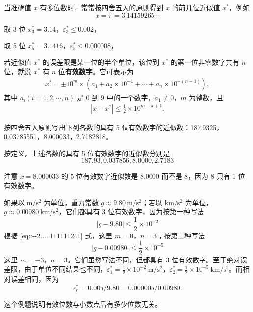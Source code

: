 \documentclass[../../main.tex]{subfiles}%
\begin{document}
\begin{example}
当准确值 $x$ 有多位数时，常常按四舍五入的原则得到 $x$ 的前几位近似值 $x^*$，例如 
\[
x = \pi = 3.14159265\cdots
\]

取 3 位  $x_3^* = 3.14$，$\varepsilon_3^* \leqslant 0.002$，

取 5 位  $x_5^* = 3.1416$，$\varepsilon_5^* \leqslant 0.000008$，
\end{example}

\begin{definition}[有效数字]
若近似值 $x^*$ 的误差限是某一位的半个单位，该位到 $x^*$ 的第一位非零数字共有 $n$ 位，就说 $x^*$ 有 $n$ 位\textbf{有效数字}。它可表示为 
\begin{align}
x^* = \pm 10^m \times (a_1 + a_2 \times 10^{-1} + \cdots + a_n \times 10^{-(n - 1)}),\label{eq::--2.....111111241}
\end{align}
其中 $a_i (i = 1, 2, \cdots, n)$ 是 0 到 9 中的一个数字，$a_1 \neq 0$，$m$ 为整数，且 
\begin{align}
| x - x^* | \leqslant \frac{1}{2} \times 10^{m - n + 1}.\label{eq::--2.....111111242}
\end{align}
\end{definition}

\begin{example}
按四舍五入原则写出下列各数的具有 5 位有效数字的近似数：187.9325，0.03785551，8.000033，2.7182818。
\end{example}
\begin{solution}

按定义，上述各数的具有 5 位有效数字的近似数分别是 
\[
187.93, 0.037856, 8.0000, 2.7183
\]

注意 $x = 8.000033$ 的 5 位有效数字近似数是 8.0000 而不是 8，因为 8 只有 1 位有效数字。

\end{solution}

\begin{example}
如果以 $\mathrm{m/s^2}$ 为单位，重力常数 $g \approx 9.80\ \mathrm{m/s^2}$；若以 $\mathrm{km/s^2}$ 为单位，$g \approx 0.00980\ \mathrm{km/s^2}$，它们都具有 3 位有效数字，因为按第一种写法 
\[
| g - 9.80 | \leqslant \frac{1}{2} \times 10^{-2}
\]
根据 \eqref{eq::--2.....111111241} 式，这里 $m = 0$，$n = 3$；按第二种写法 
\[
| g - 0.00980 | \leqslant \frac{1}{2} \times 10^{-5}
\]
这里 $m = -3$，$n = 3$。它们虽然写法不同，但都具有 3 位有效数字。至于绝对误差限，由于单位不同结果也不同，$\varepsilon_1^* = \frac{1}{2} \times 10^{-2}\ \mathrm{m/s^2}$，$\varepsilon_2^* = \frac{1}{2} \times 10^{-5}\ \mathrm{km/s^2}$。而相对误差相同，因为 
\[
\varepsilon_r^* = 0.005 / 9.80 = 0.000005 / 0.00980.
\]
\end{example}
\begin{note}
这个例题说明有效位数与小数点后有多少位数无关。
\end{note}
\end{document}
